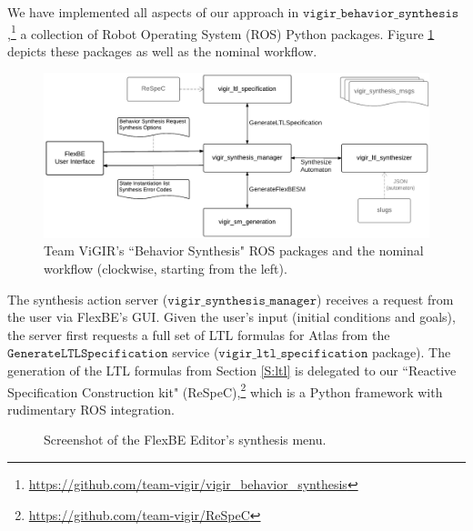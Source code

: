 
We have implemented all aspects of our approach in $\mathtt{vigir\_behavior\_synthesis}$,\footnote{\scriptsize{\url{https://github.com/team-vigir/vigir_behavior_synthesis}}}
 a collection of Robot Operating System (ROS) Python packages.
Figure \ref{Fig:vigir_behavior_synthesis} depicts these packages as well as the nominal workflow.

\begin{figure}[t]
\centering
\includegraphics[width=0.99\columnwidth,clip]{./img/behavior_synthesis_packages.png}
\caption{
	Team ViGIR's ``Behavior Synthesis" ROS packages and the nominal workflow (clockwise, starting from the left).
}
\label{Fig:vigir_behavior_synthesis}
\end{figure}

The synthesis action server ($\mathtt{vigir\_synthesis\_manager}$) receives a request from the user via FlexBE's GUI.
Given the user's input (initial conditions and goals), the server first requests a full set of LTL formulas for Atlas from the $\mathtt{Generate LTL Specification}$ service ($\mathtt{vigir\_ltl\_specification}$ package).
The generation of the LTL formulas from Section \ref{S:ltl} is delegated to our ``Reactive Specification Construction kit" (ReSpeC),\footnote{\scriptsize{\url{https://github.com/team-vigir/ReSpeC}}}
 which is a Python framework with rudimentary ROS integration.

\begin{figure}[t]
\centering
{}
\caption{Screenshot of the FlexBE Editor's synthesis menu.
}
\label{Fig:SynthesisMenuSimple}
\end{figure}

